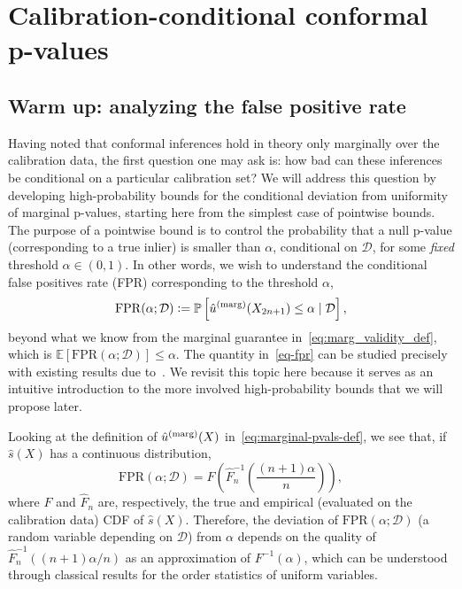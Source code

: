 \documentclass[11pt]{article}
\newcommand{\defeq}{\vcentcolon=}
\def\E{\mathbb{E}}
\def\marg{\textnormal{(marg)}}
\renewcommand{\P}{\mathbb{P}}
\begin{document}
\section{Calibration-conditional conformal p-values} \label{sec:simult_conformal}

\subsection{Warm up: analyzing the false positive rate} \label{sec:warmup-fpr}

Having noted that conformal inferences hold in theory only marginally over the calibration data, the first question one may ask is: how bad can these inferences be conditional on a particular calibration set?
We will address this question by developing high-probability bounds for the conditional deviation from uniformity of marginal p-values, starting here from the simplest case of pointwise bounds. 
The purpose of a pointwise bound is to control the probability that a null p-value (corresponding to a true inlier) is smaller than $\alpha$, conditional on $\mathcal{D}$, for some {\em fixed} threshold $\alpha \in (0,1)$.
In other words, we wish to understand the conditional false positives rate (FPR) corresponding to the threshold $\alpha$,
\begin{equation} \label{eq-fpr}
    \mathrm{FPR}(\alpha; \mathcal{D}) \defeq \P\left[\hat{u}^\marg(X_{2n+1}) \leq \alpha \mid \mathcal{D}\right],
\end{equation}
beyond what we know from the marginal guarantee in~\eqref{eq:marg_validity_def}, which is $\E\left[\mathrm{FPR}(\alpha; \mathcal{D})\right] \le \alpha$.
The quantity in~\eqref{eq-fpr} can be studied precisely with existing results due to~\cite{vovk2012conditional}. We revisit this topic here because it serves as an intuitive introduction to the more involved high-probability bounds that we will propose later. 

{Looking at the definition of $\hat{u}^\marg(X)$ in~\eqref{eq:marginal-pvals-def}}, we see that, if $\hat{s}(X)$ has a continuous distribution,
\begin{equation*}
    \mathrm{FPR}(\alpha; \mathcal{D}) = F\left(\hat{F}_n^{-1}\left(\frac{(n + 1) \alpha}{n}\right)\right),
\end{equation*}
{where $F$ and $\hat{F}_n$ are, respectively, the true and empirical (evaluated on the calibration data) CDF of $\hat{s}(X)$.}
Therefore, the deviation of $\mathrm{FPR}(\alpha; \mathcal{D})$ {(a random variable depending on $\mathcal{D}$)} from $\alpha$ depends on the quality of $\hat{F}_n^{-1}((n+1)\alpha/n)$ as an approximation of $F^{-1}(\alpha)$, which can be understood through classical results for the order statistics of uniform variables.
\end{document}
